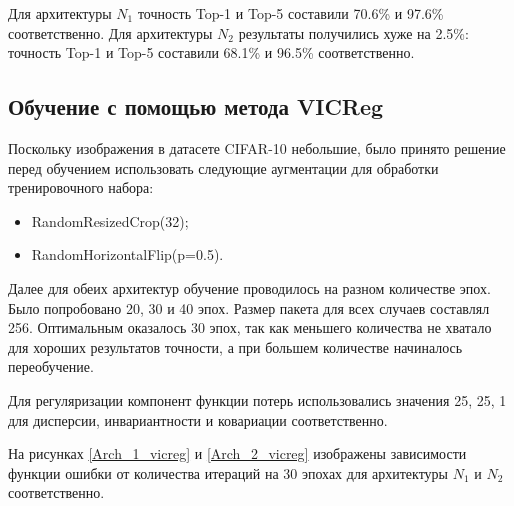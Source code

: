 Для архитектуры $N_1$ точность Top-1 и Top-5 составили 70.6\% и 97.6\% соответственно. Для архитектуры $N_2$ результаты получились хуже на 2.5\%: точность Top-1 и Top-5 составили 68.1\% и 96.5\% соответственно.

\subsection{Обучение с помощью метода VICReg}

Поскольку изображения в датасете CIFAR-10 небольшие, было принято решение перед обучением использовать следующие аугментации для обработки тренировочного набора:
\begin{itemize}
    \item RandomResizedCrop(32);
    \item RandomHorizontalFlip(p=0.5).
\end{itemize}

Далее для обеих архитектур обучение проводилось на разном количестве эпох. Было попробовано 20, 30 и 40 эпох. Размер пакета для всех случаев составлял 256. Оптимальным оказалось 30 эпох, так как меньшего количества не хватало для хороших результатов точности, а при большем количестве начиналось переобучение.

Для регуляризации компонент функции потерь использовались значения 25, 25, 1 для дисперсии, инвариантности и ковариации соответственно.

На рисунках \ref{Arch_1_vicreg} и \ref{Arch_2_vicreg} изображены зависимости функции ошибки от количества итераций на 30 эпохах для архитектуры $N_1$ и $N_2$ соответственно.

